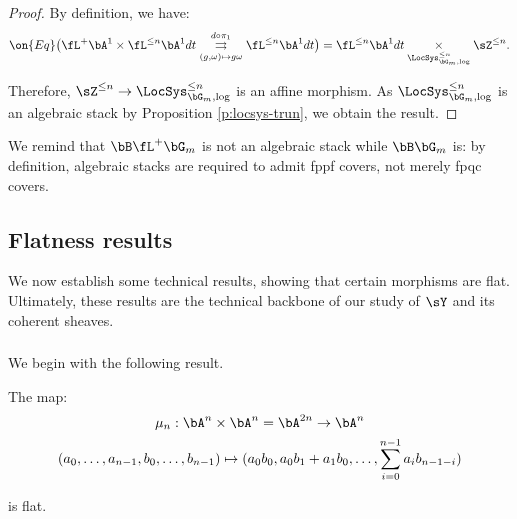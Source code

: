 \begin{proof}

By definition, we have:
%
\[
\on{Eq}\big(\fL^+ \bA^1 \times \fL^{\leq n} \bA^1 dt
\underset{(g,\omega) \mapsto g\omega}{\overset{d\circ \pi_1}{\rightrightarrows}}
\fL^{\leq n} \bA^1 dt\big) =
\fL^{\leq n} \bA^1 dt \underset{\LocSys_{\bG_m,\log}^{\leq n}}{\times}
\sZ^{\leq n}.
\]

 Therefore, $\sZ^{\leq n} \to \LocSys_{\bG_m,\log}^{\leq n}$ is
an affine morphism. As $\LocSys_{\bG_m,\log}^{\leq n}$ is an algebraic stack
by Proposition \ref{p:locsys-trun}, we obtain the result.

\end{proof}

\begin{rem}
\notready

We remind that $\bB \fL^+ \bG_m$ is not an algebraic stack
while $\bB \bG_m$ is: by definition, algebraic stacks are required
to admit fppf covers, not merely fpqc covers.

\end{rem}

\subsection{Flatness results}\label{ss:flatness}

We now establish some technical results, showing that certain morphisms
are flat. Ultimately, these results are the technical backbone of
our study of $\sY$ and its coherent sheaves.

\subsubsection{}

We begin with the following result.

\begin{lem}
\notready\label{l:flat-mult}

The map:
%
\[
\begin{gathered}
\mu_n:\bA^n \times \bA^n = \bA^{2n} \to \bA^n \\
(a_0,\ldots,a_{n-1},b_0,\ldots,b_{n-1}) \mapsto
(a_0b_0,a_0b_1+a_1b_0,\ldots,\sum_{i = 0}^{n-1} a_ib_{n-1-i})
\end{gathered}
\]

 is flat.

\end{lem}

